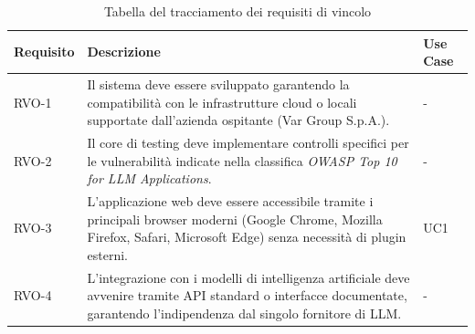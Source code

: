 \begin{table}%
\caption{Tabella del tracciamento dei requisiti di vincolo}
\label{tab:requisiti-vincolo}
\begin{tabularx}{\textwidth}{lXl}
\hline\hline
\textbf{Requisito} & \textbf{Descrizione} & \textbf{Use Case}\\
\hline
RVO-1    & Il sistema deve essere sviluppato garantendo la compatibilità con le infrastrutture cloud o locali supportate dall'azienda ospitante (Var Group S.p.A.). & - \\
\hline
RVO-2    & Il core di testing deve implementare controlli specifici per le vulnerabilità indicate nella classifica \emph{OWASP Top 10 for LLM Applications}. & - \\
\hline
RVO-3    & L'applicazione web deve essere accessibile tramite i principali browser moderni (Google Chrome, Mozilla Firefox, Safari, Microsoft Edge) senza necessità di plugin esterni. & UC1 \\
\hline
RVO-4    & L'integrazione con i modelli di intelligenza artificiale deve avvenire tramite API standard o interfacce documentate, garantendo l'indipendenza dal singolo fornitore di LLM. & - \\
\hline
\end{tabularx}
\end{table}%


